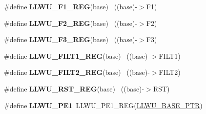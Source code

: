 \begin{DoxyCompactItemize}
\item 
\hypertarget{group___l_l_w_u___register___accessor___macros_ga3f4c680add377053731e36faf88c85c2}{}\#define {\bfseries L\+L\+W\+U\+\_\+\+F1\+\_\+\+R\+E\+G}(base)                                            ~((base)-\/$>$F1)\label{group___l_l_w_u___register___accessor___macros_ga3f4c680add377053731e36faf88c85c2}

\item 
\hypertarget{group___l_l_w_u___register___accessor___macros_ga9824713b71d34e05dd1783c6e0153a3c}{}\#define {\bfseries L\+L\+W\+U\+\_\+\+F2\+\_\+\+R\+E\+G}(base)                                            ~((base)-\/$>$F2)\label{group___l_l_w_u___register___accessor___macros_ga9824713b71d34e05dd1783c6e0153a3c}

\item 
\hypertarget{group___l_l_w_u___register___accessor___macros_ga8369b30780db4c76aa70c8adf1a763fa}{}\#define {\bfseries L\+L\+W\+U\+\_\+\+F3\+\_\+\+R\+E\+G}(base)                                            ~((base)-\/$>$F3)\label{group___l_l_w_u___register___accessor___macros_ga8369b30780db4c76aa70c8adf1a763fa}

\item 
\hypertarget{group___l_l_w_u___register___accessor___macros_ga1c17851f00a54116b482596824ddd13c}{}\#define {\bfseries L\+L\+W\+U\+\_\+\+F\+I\+L\+T1\+\_\+\+R\+E\+G}(base)                                      ~((base)-\/$>$F\+I\+L\+T1)\label{group___l_l_w_u___register___accessor___macros_ga1c17851f00a54116b482596824ddd13c}

\item 
\hypertarget{group___l_l_w_u___register___accessor___macros_ga5b8d2b94b1ac6dfdf82b7eaee7760152}{}\#define {\bfseries L\+L\+W\+U\+\_\+\+F\+I\+L\+T2\+\_\+\+R\+E\+G}(base)                                      ~((base)-\/$>$F\+I\+L\+T2)\label{group___l_l_w_u___register___accessor___macros_ga5b8d2b94b1ac6dfdf82b7eaee7760152}

\item 
\hypertarget{group___l_l_w_u___register___accessor___macros_ga2cd305f92495adf56b038b6f98471e2d}{}\#define {\bfseries L\+L\+W\+U\+\_\+\+R\+S\+T\+\_\+\+R\+E\+G}(base)                                          ~((base)-\/$>$R\+S\+T)\label{group___l_l_w_u___register___accessor___macros_ga2cd305f92495adf56b038b6f98471e2d}

\item 
\hypertarget{group___l_l_w_u___register___accessor___macros_gaef03e73b53506377462ca326729d4ff7}{}\#define {\bfseries L\+L\+W\+U\+\_\+\+P\+E1}~L\+L\+W\+U\+\_\+\+P\+E1\+\_\+\+R\+E\+G(\hyperlink{group___l_l_w_u___peripheral_ga89c97b9e8756088cb3d8617c022ae6ac}{L\+L\+W\+U\+\_\+\+B\+A\+S\+E\+\_\+\+P\+T\+R})\label{group___l_l_w_u___register___accessor___macros_gaef03e73b53506377462ca326729d4ff7}


\end{DoxyCompactItemize}
